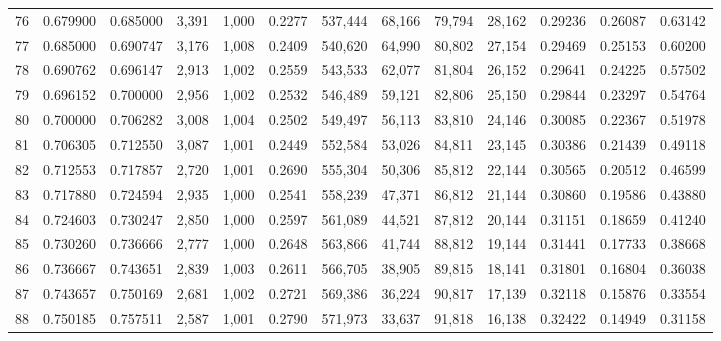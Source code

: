 \begin{tabular}{rrrrrrrrrrrrr}
76  &  0.679900 &  0.685000 &   3,391 &  1,000 &                                     0.2277 &  537,444 &   68,166 &   79,794 &   28,162 &  0.29236 &  0.26087 &  0.63142 \\
77  &  0.685000 &  0.690747 &   3,176 &  1,008 &                                     0.2409 &  540,620 &   64,990 &   80,802 &   27,154 &  0.29469 &  0.25153 &  0.60200 \\
78  &  0.690762 &  0.696147 &   2,913 &  1,002 &                                     0.2559 &  543,533 &   62,077 &   81,804 &   26,152 &  0.29641 &  0.24225 &  0.57502 \\
79  &  0.696152 &  0.700000 &   2,956 &  1,002 &                                     0.2532 &  546,489 &   59,121 &   82,806 &   25,150 &  0.29844 &  0.23297 &  0.54764 \\
80  &  0.700000 &  0.706282 &   3,008 &  1,004 &                                     0.2502 &  549,497 &   56,113 &   83,810 &   24,146 &  0.30085 &  0.22367 &  0.51978 \\
81  &  0.706305 &  0.712550 &   3,087 &  1,001 &                                     0.2449 &  552,584 &   53,026 &   84,811 &   23,145 &  0.30386 &  0.21439 &  0.49118 \\
82  &  0.712553 &  0.717857 &   2,720 &  1,001 &                                     0.2690 &  555,304 &   50,306 &   85,812 &   22,144 &  0.30565 &  0.20512 &  0.46599 \\
83  &  0.717880 &  0.724594 &   2,935 &  1,000 &                                     0.2541 &  558,239 &   47,371 &   86,812 &   21,144 &  0.30860 &  0.19586 &  0.43880 \\
84  &  0.724603 &  0.730247 &   2,850 &  1,000 &                                     0.2597 &  561,089 &   44,521 &   87,812 &   20,144 &  0.31151 &  0.18659 &  0.41240 \\
85  &  0.730260 &  0.736666 &   2,777 &  1,000 &                                     0.2648 &  563,866 &   41,744 &   88,812 &   19,144 &  0.31441 &  0.17733 &  0.38668 \\
86  &  0.736667 &  0.743651 &   2,839 &  1,003 &                                     0.2611 &  566,705 &   38,905 &   89,815 &   18,141 &  0.31801 &  0.16804 &  0.36038 \\
87  &  0.743657 &  0.750169 &   2,681 &  1,002 &                                     0.2721 &  569,386 &   36,224 &   90,817 &   17,139 &  0.32118 &  0.15876 &  0.33554 \\
88  &  0.750185 &  0.757511 &   2,587 &  1,001 &                                     0.2790 &  571,973 &   33,637 &   91,818 &   16,138 &  0.32422 &  0.14949 &  0.31158 \\

\end{tabular}
